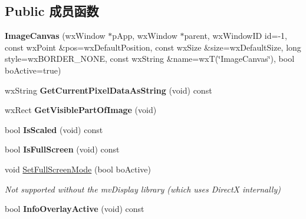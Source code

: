 \subsection*{Public 成员函数}
\begin{DoxyCompactItemize}
\item 
\hypertarget{class_image_canvas_a63f276994b62c23a84fa81fe8197cef1}{{\bfseries Image\+Canvas} (wx\+Window $\ast$p\+App, wx\+Window $\ast$parent, wx\+Window\+I\+D id=-\/1, const wx\+Point \&pos=wx\+Default\+Position, const wx\+Size \&size=wx\+Default\+Size, long style=wx\+B\+O\+R\+D\+E\+R\+\_\+\+N\+O\+N\+E, const wx\+String \&name=wx\+T(\char`\"{}Image\+Canvas\char`\"{}), bool bo\+Active=true)}\label{class_image_canvas_a63f276994b62c23a84fa81fe8197cef1}

\item 
\hypertarget{class_image_canvas_a31d810eebd144ca876339ff81f04b08e}{wx\+String {\bfseries Get\+Current\+Pixel\+Data\+As\+String} (void) const }\label{class_image_canvas_a31d810eebd144ca876339ff81f04b08e}

\item 
\hypertarget{class_image_canvas_ab92c5d6aaa84a45aca8ecf5fb1971a64}{wx\+Rect {\bfseries Get\+Visible\+Part\+Of\+Image} (void)}\label{class_image_canvas_ab92c5d6aaa84a45aca8ecf5fb1971a64}

\item 
\hypertarget{class_image_canvas_af91056aae00eef8cf23f1eba6a9d6091}{bool {\bfseries Is\+Scaled} (void) const }\label{class_image_canvas_af91056aae00eef8cf23f1eba6a9d6091}

\item 
\hypertarget{class_image_canvas_a6b9d8a11981ec7344ec3ab13c0d02cc9}{bool {\bfseries Is\+Full\+Screen} (void) const }\label{class_image_canvas_a6b9d8a11981ec7344ec3ab13c0d02cc9}

\item 
\hypertarget{class_image_canvas_aba9e617c78a2e446a46c675f1d3583d8}{void \hyperlink{class_image_canvas_aba9e617c78a2e446a46c675f1d3583d8}{Set\+Full\+Screen\+Mode} (bool bo\+Active)}\label{class_image_canvas_aba9e617c78a2e446a46c675f1d3583d8}

\begin{DoxyCompactList}\small\item\em Not supported without the mv\+Display library (which uses Direct\+X internally) \end{DoxyCompactList}\item 
\hypertarget{class_image_canvas_a8b5f86f4c80fc73055acb709e54a45f4}{bool {\bfseries Info\+Overlay\+Active} (void) const }\label{class_image_canvas_a8b5f86f4c80fc73055acb709e54a45f4}


\end{DoxyCompactItemize}
